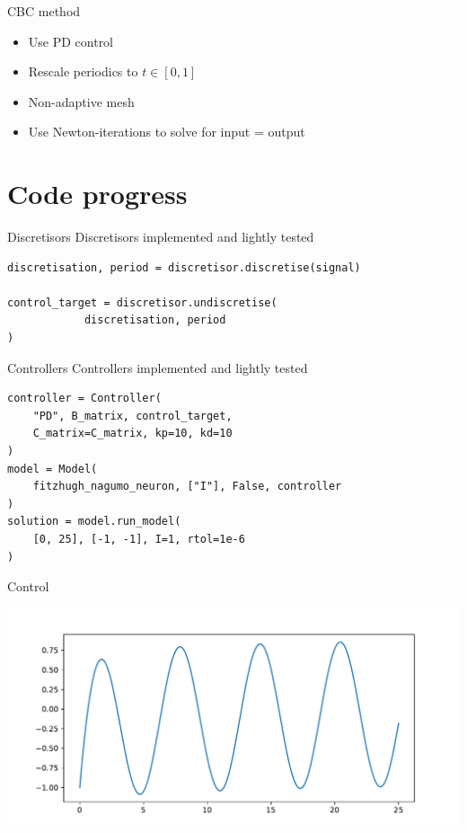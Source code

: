 \documentclass[presentation]{beamer}
\begin{document}
\begin{frame}[label={sec:orgce51a2d}]{CBC method}
\begin{itemize}
\item Use PD control
\item Rescale periodics to \(t\in[0,1]\)
\item Non-adaptive mesh
\item Use Newton-iterations to solve for input = output
\end{itemize}
\end{frame}

\section{Code progress}
\label{sec:orgc474986}
\begin{frame}[fragile,label={sec:org0ccdcde}]{Discretisors}
 Discretisors implemented and lightly tested

\vfill

\begin{verbatim}
discretisation, period = discretisor.discretise(signal)

control_target = discretisor.undiscretise(
		    discretisation, period
)
\end{verbatim}
\end{frame}

\begin{frame}[fragile,label={sec:org90a3d81}]{Controllers}
 Controllers implemented and lightly tested

\begin{verbatim}
controller = Controller(
    "PD", B_matrix, control_target, 
    C_matrix=C_matrix, kp=10, kd=10
)
model = Model(
    fitzhugh_nagumo_neuron, ["I"], False, controller
)
solution = model.run_model(
    [0, 25], [-1, -1], I=1, rtol=1e-6
)  
\end{verbatim}
\end{frame}

\begin{frame}[label={sec:orgdceb19f}]{Control}
\begin{center}
\includegraphics[width=.9\linewidth]{./controlled.pdf}
\end{center}
\end{frame}
\end{document}
